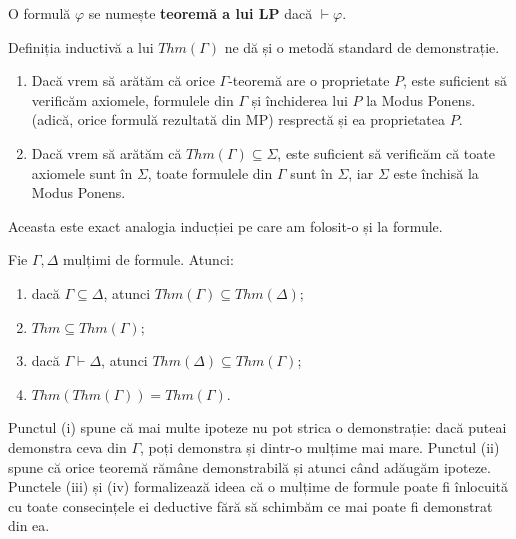 \begin{definition}
	O formulă \( \varphi \) se numește \textbf{teoremă a lui LP} dacă \( \vdash \varphi \).
\end{definition}

\begin{note}
	Definiția inductivă a lui \( Thm(\Gamma) \) ne dă și o metodă standard de demonstrație.

	\begin{enumerate}
		\item Dacă vrem să arătăm că orice \( \Gamma \)-teoremă are o proprietate \( P \), este suficient să verificăm axiomele, formulele din \( \Gamma \) și închiderea lui \( P \) la Modus Ponens.
		      (adică, orice formulă rezultată din MP) resprectă și ea proprietatea \( P \).
		\item Dacă vrem să arătăm că \( Thm(\Gamma) \subseteq \Sigma \), este suficient să verificăm că toate axiomele sunt în \( \Sigma \), toate formulele din \( \Gamma \) sunt în \( \Sigma \), iar \( \Sigma \) este închisă la Modus Ponens.
	\end{enumerate}

	Aceasta este exact analogia inducției pe care am folosit-o și la formule.
\end{note}

\begin{prop}
	Fie \( \Gamma, \Delta \) mulțimi de formule. Atunci:
	\begin{enumerate}
		\item dacă \( \Gamma \subseteq \Delta \), atunci \( Thm(\Gamma) \subseteq Thm(\Delta) \);
		\item \( Thm \subseteq Thm(\Gamma) \);
		\item dacă \( \Gamma \vdash \Delta \), atunci \( Thm(\Delta) \subseteq Thm(\Gamma) \);
		\item \( Thm(Thm(\Gamma)) = Thm(\Gamma) \).
	\end{enumerate}
\end{prop}

\vspace{0.5cm}

Punctul (i) spune că mai multe ipoteze nu pot strica o demonstrație: dacă puteai demonstra ceva din \( \Gamma \), poți demonstra și dintr-o mulțime mai mare.
Punctul (ii) spune că orice teoremă rămâne demonstrabilă și atunci când adăugăm ipoteze. Punctele (iii) și (iv) formalizează ideea că o mulțime de formule poate
fi înlocuită cu toate consecințele ei deductive fără să schimbăm ce mai poate fi demonstrat din ea.


